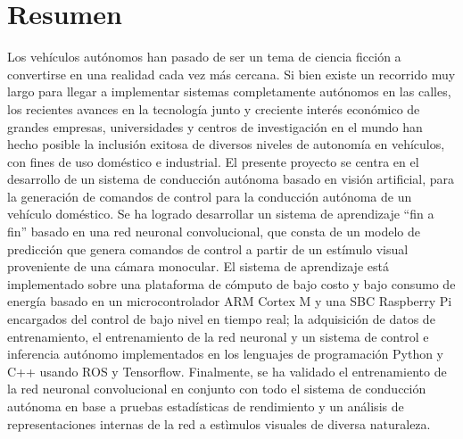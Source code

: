 \chapter*{Resumen} %

Los vehículos autónomos han pasado de ser un tema de ciencia ficción a convertirse en una 
realidad cada vez más cercana. Si bien existe un recorrido muy largo para llegar a 
implementar sistemas completamente autónomos en las calles, los recientes avances en la tecnología 
junto y creciente interés económico de grandes empresas, universidades y centros de investigación 
en el mundo han hecho posible la inclusión exitosa de diversos niveles de autonomía en vehículos, con fines de 
uso doméstico e industrial. El presente proyecto se centra en el desarrollo de un sistema 
de conducción autónoma basado en visión artificial, para la generación de comandos de control para la 
conducción autónoma de un vehículo doméstico. Se ha logrado desarrollar un sistema de aprendizaje 
“fin a fin” basado en una red neuronal convolucional, que consta de un modelo de predicción que genera 
comandos de control a partir de un estímulo visual proveniente de una cámara monocular. El sistema de 
aprendizaje está implementado sobre una plataforma de cómputo de bajo costo y bajo consumo de energía 
basado en un microcontrolador ARM Cortex M y una SBC Raspberry Pi encargados del control de bajo nivel 
en tiempo real; la adquisición de datos de entrenamiento, el entrenamiento de la red neuronal y un 
sistema de control e inferencia autónomo implementados en los lenguajes de programación Python y C++ 
usando ROS y Tensorflow. Finalmente, se ha validado el entrenamiento de la red neuronal convolucional 
en conjunto con todo el sistema de conducción autónoma en base a pruebas estadísticas de rendimiento y un 
análisis de representaciones internas de la red a estìmulos visuales de diversa naturaleza.
